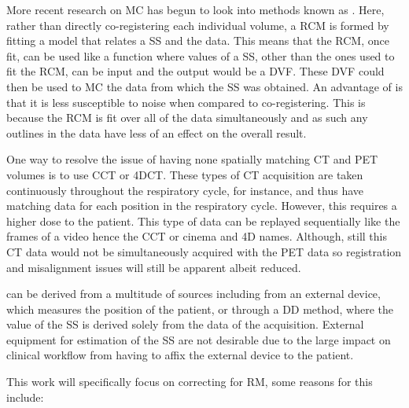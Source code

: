         More recent research on \gls{MC} has begun to look into methods known as . Here, rather than directly co-registering each individual volume, a \gls{RCM} is formed by fitting a model that relates a \gls{SS} and the data. This means that the \gls{RCM}, once fit, can be used like a function where values of a \gls{SS}, other than the ones used to fit the \gls{RCM}, can be input and the output would be a \gls{DVF}. These \gls{DVF} could then be used to \gls{MC} the data from which the \gls{SS} was obtained. An advantage of  is that it is less susceptible to noise when compared to co-registering. This is because the \gls{RCM} is fit over all of the data simultaneously and as such any outlines in the data have less of an effect on the overall result.
            
        One way to resolve the issue of having none spatially matching \gls{CT} and \gls{PET} volumes is to use \gls{CCT} or \gls{4DCT}. These types of \gls{CT} acquisition are taken continuously throughout the respiratory cycle, for instance, and thus have matching data for each position in the respiratory cycle. However, this requires a higher dose to the patient. This type of data can be replayed sequentially like the frames of a video hence the \gls{CCT} or cinema and \gls{4D} names. Although, still this \gls{CT} data would not be simultaneously acquired with the \gls{PET} data so registration and misalignment issues will still be apparent albeit reduced. 
    
         can be derived from a multitude of sources including from an external device, which measures the position of the patient, or through a \gls{DD} method, where the value of the \gls{SS} is derived solely from the data of the acquisition. External equipment for estimation of the \gls{SS} are not desirable due to the large impact on clinical workflow from having to affix the external device to the patient. %
            
        This work will specifically focus on correcting for \gls{RM}, some reasons for this include:
            
